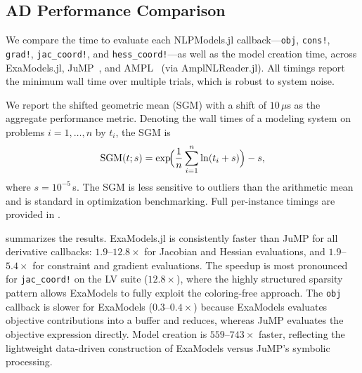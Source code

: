 \documentclass[11pt]{article}
\begin{document}
\subsection{AD Performance Comparison}
\label{sec:numerics:ad}

We compare the time to evaluate each NLPModels.jl callback---\texttt{obj}, \texttt{cons!}, \texttt{grad!}, \texttt{jac\_coord!}, and \texttt{hess\_coord!}---as well as the model creation time, across ExaModels.jl, JuMP~\citep{lubinJuMP10Recent2023}, and AMPL~\citep{fourerModelingLanguageMathematical1990} (via AmplNLReader.jl). All timings report the minimum wall time over multiple trials, which is robust to system noise.

We report the shifted geometric mean (SGM) with a shift of $10\,\mu$s as the aggregate performance metric. Denoting the wall times of a modeling system on problems $i = 1, \ldots, n$ by $t_i$, the SGM is
\begin{equation}
  \label{eq:sgm}
  \operatorname{SGM}(t; s) = \exp\!\Bigl(\frac{1}{n}\sum_{i=1}^n \ln(t_i + s)\Bigr) - s,
\end{equation}
where $s = 10^{-5}$\,s. The SGM is less sensitive to outliers than the arithmetic mean and is standard in optimization benchmarking. Full per-instance timings are provided in .

 summarizes the results. ExaModels.jl is consistently faster than JuMP for all derivative callbacks: $1.9$--$12.8\times$ for Jacobian and Hessian evaluations, and $1.9$--$5.4\times$ for constraint and gradient evaluations. The speedup is most pronounced for \texttt{jac\_coord!} on the LV suite ($12.8\times$), where the highly structured sparsity pattern allows ExaModels to fully exploit the coloring-free approach. The \texttt{obj} callback is slower for ExaModels ($0.3$--$0.4\times$) because ExaModels evaluates objective contributions into a buffer and reduces, whereas JuMP evaluates the objective expression directly. Model creation is $559$--$743\times$ faster, reflecting the lightweight data-driven construction of ExaModels versus JuMP's symbolic processing.

\begin{table}[t]
  \centering
  \caption{Shifted geometric mean (SGM, $s = 10^{-5}$\,s) of callback times in seconds.
    Speedup = JuMP\,/\,ExaModels (higher is better for ExaModels).
    All timings on Apple M2 Pro, single-threaded, Julia 1.12.}
  \label{tab:sgm}
   
\end{table} 
\end{document}
